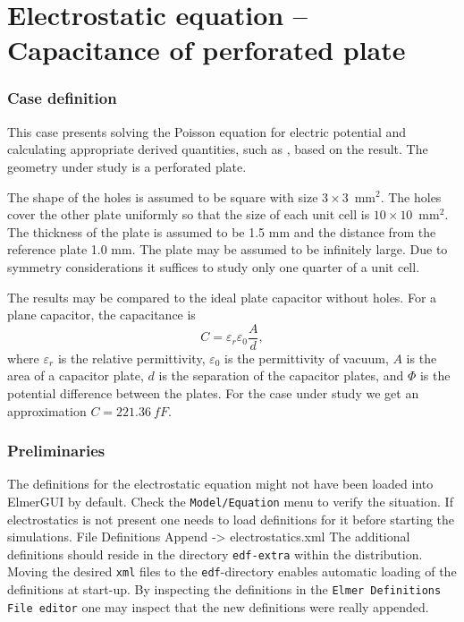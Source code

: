 \chapter{Electrostatic equation -- Capacitance of perforated plate}



\subsection*{Case definition}

This case presents solving the Poisson equation for electric potential
and calculating appropriate derived quantities, such as
, based on the result. 
The geometry under study is a perforated plate.

The shape of the holes is assumed to be square with size $3\times 3$~mm$^2$.
The holes cover the other plate uniformly so that the size of each unit cell is 
$10\times 10$~mm$^2$.
The thickness of the plate is assumed to be 
1.5 mm and the distance from the reference plate 1.0 mm. 
The plate may be assumed to be infinitely large. Due to symmetry considerations it suffices to study
only one quarter of a unit cell.

The results may be compared to the ideal plate capacitor without holes. 
For a plane capacitor, the
capacitance is
\begin{equation}
C=\varepsilon_r\varepsilon_0\frac{A}{d},
\end{equation}
where $\varepsilon_r$ is the relative permittivity, $\varepsilon_0$
is the permittivity of vacuum, $A$ is the area of a capacitor plate,
$d$ is the separation of the capacitor plates, and $\Phi$ is the
potential difference between the plates.
For the case under study we get an approximation $C=221.36~fF$.


\subsection*{Preliminaries}

The definitions for the electrostatic equation might not have been loaded into ElmerGUI by default. Check the 
\texttt{Model/Equation} menu
to verify the situation. If electrostatics is not present  
one needs to load definitions for it before starting the simulations.
\ttbegin
File 
  Definitions
    Append -> electrostatics.xml
\ttend
The additional definitions should reside in the directory \texttt{edf-extra} within the distribution.
Moving the desired \texttt{xml} files to the \texttt{edf}-directory enables automatic loading of the 
definitions at start-up. By inspecting the definitions in the \texttt{Elmer Definitions File editor} one
may inspect that the new definitions were really appended. 


